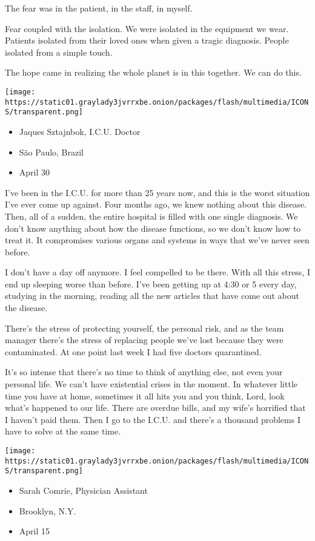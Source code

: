 The fear was in the patient, in the staff, in myself.

Fear coupled with the isolation. We were isolated in the equipment we
wear. Patients isolated from their loved ones when given a tragic
diagnosis. People isolated from a simple touch.

The hope came in realizing the whole planet is in this together. We can
do this.

\texttt{[image: https://static01.graylady3jvrrxbe.onion/packages/flash/multimedia/ICONS/transparent.png]}

\begin{itemize}
\tightlist
\item
  Jaques Sztajnbok, I.C.U. Doctor
\item
  São Paulo, Brazil
\item
  April 30
\end{itemize}

I've been in the I.C.U. for more than 25 years now, and this is the
worst situation I've ever come up against. Four months ago, we knew
nothing about this disease. Then, all of a sudden, the entire hospital
is filled with one single diagnosis. We don't know anything about how
the disease functions, so we don't know how to treat it. It compromises
various organs and systems in ways that we've never seen before.

I don't have a day off anymore. I feel compelled to be there. With all
this stress, I end up sleeping worse than before. I've been getting up
at 4:30 or 5 every day, studying in the morning, reading all the new
articles that have come out about the disease.

There's the stress of protecting yourself, the personal risk, and as the
team manager there's the stress of replacing people we've lost because
they were contaminated. At one point last week I had five doctors
quarantined.

It's so intense that there's no time to think of anything else, not even
your personal life. We can't have existential crises in the moment. In
whatever little time you have at home, sometimes it all hits you and you
think, Lord, look what's happened to our life. There are overdue bills,
and my wife's horrified that I haven't paid them. Then I go to the
I.C.U. and there's a thousand problems I have to solve at the same time.

\texttt{[image: https://static01.graylady3jvrrxbe.onion/packages/flash/multimedia/ICONS/transparent.png]}

\begin{itemize}
\tightlist
\item
  Sarah Comrie, Physician Assistant
\item
  Brooklyn, N.Y.
\item
  April 15
\end{itemize}


